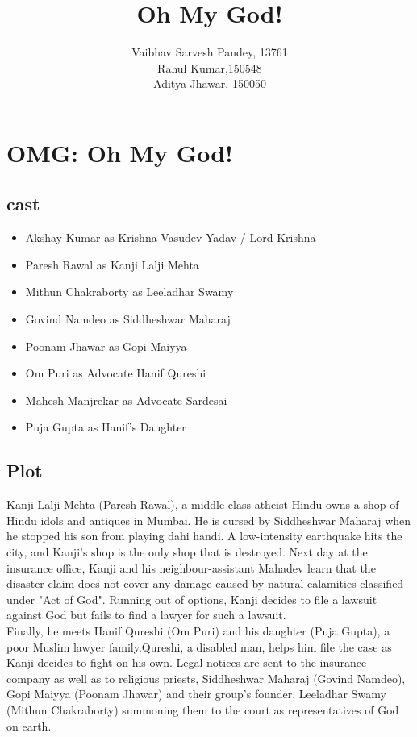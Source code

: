 \documentclass[a4paper]{article}
\title{Oh My God! }
\author{Vaibhav Sarvesh Pandey, 13761\\

	Rahul Kumar,150548\\
	Aditya Jhawar, 150050}
\begin{document}
	\maketitle
	

\section{OMG: Oh My God! }
\subsection{cast}
\begin{itemize}
\item Akshay Kumar as Krishna Vasudev Yadav / Lord Krishna
\item Paresh Rawal as Kanji Lalji Mehta
\item Mithun Chakraborty as Leeladhar Swamy
\item Govind Namdeo as Siddheshwar Maharaj
\item Poonam Jhawar as Gopi Maiyya
\item Om Puri as Advocate Hanif Qureshi
\item Mahesh Manjrekar as Advocate Sardesai
\item Puja Gupta as Hanif's Daughter                 	  
\end{itemize}

\subsection{Plot}
Kanji Lalji Mehta (Paresh Rawal), a middle-class atheist Hindu owns a shop of Hindu idols and antiques in Mumbai. He is cursed by Siddheshwar Maharaj when he stopped his son from playing dahi handi. A low-intensity earthquake hits the city, and Kanji's shop is the only shop that is destroyed. Next day at the insurance office, Kanji and his neighbour-assistant Mahadev learn that the disaster claim does not cover any damage caused by natural calamities classified under "Act of God".   Running out of options, Kanji decides to file a lawsuit against God but fails to find a lawyer for such a lawsuit.\\
	Finally, he meets Hanif Qureshi (Om Puri) and his daughter (Puja Gupta), a poor Muslim lawyer family.Qureshi, a disabled man, helps him file the case as Kanji decides to fight on his own. Legal notices are sent to the insurance company as well as to religious priests, Siddheshwar Maharaj (Govind Namdeo), Gopi Maiyya (Poonam Jhawar) and their group's founder, Leeladhar Swamy (Mithun Chakraborty) summoning them to the court as representatives of God on earth.	        
	                  
\end{document}
